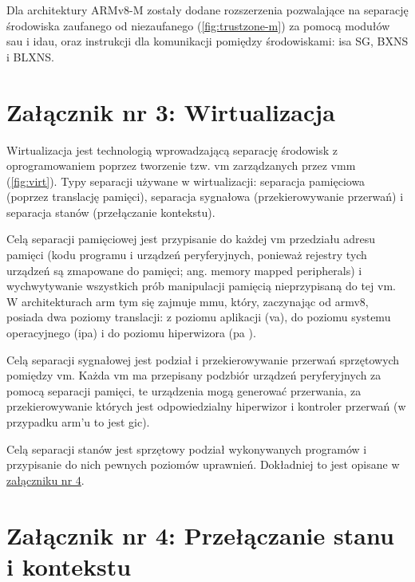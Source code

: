 \documentclass[../main]{subfiles}
\begin{document}
Dla architektury ARMv8-M zostały dodane rozszerzenia pozwalające na separację środowiska zaufanego od
niezaufanego (\cref{fig:trustzone-m}) za pomocą modułów \acrshort{sau} i \acrshort{idau},
oraz instrukcji dla komunikacji pomiędzy środowiskami: \acrshort{isa} SG, BXNS i BLXNS.
\cite{trustzonearmv8m}

\section*{Załącznik nr 3: Wirtualizacja}\label{sec:zalacznik-3}

Wirtualizacja jest technologią wprowadzającą separację środowisk z oprogramowaniem poprzez tworzenie
tzw. \acrshort{vm} zarządzanych przez \acrshort{vmm} (\cref{fig:virt}). Typy separacji używane w
wirtualizacji: separacja pamięciowa (poprzez translację pamięci), separacja sygnałowa (przekierowywanie
przerwań) i separacja stanów (przełączanie kontekstu).

Celą separacji pamięciowej jest przypisanie do każdej \acrshort{vm} przedziału adresu pamięci (kodu
programu i urządzeń peryferyjnych, ponieważ rejestry tych urządzeń są zmapowane do pamięci; ang. memory
mapped peripherals) i wychwytywanie wszystkich prób manipulacji pamięcią nieprzypisaną do tej
\acrshort{vm}. W architekturach \acrshort{arm} tym się zajmuje \acrshort{mmu}, który, zaczynając od
\acrshort{arm}v8, posiada dwa poziomy translacji: z poziomu aplikacji (\acrshort{va}), do poziomu
systemu operacyjnego (\acrshort{ipa}) i do poziomu hiperwizora (\acrshort{pa}
\cite{armv8amemtranslation}).

Celą separacji sygnałowej jest podział i przekierowywanie przerwań sprzętowych pomiędzy \acrshort{vm}.
Każda \acrshort{vm} ma przepisany podzbiór urządzeń peryferyjnych za pomocą separacji pamięci, te
urządzenia mogą generować przerwania, za przekierowywanie których jest odpowiedzialny hiperwizor i
kontroler przerwań (w przypadku \acrshort{arm}'u to jest \acrshort{gic}).

Celą separacji stanów jest sprzętowy podział wykonywanych programów i przypisanie do nich pewnych
poziomów uprawnień. Dokładniej to jest opisane w \hyperref[sec:zalacznik-4]{załączniku nr 4}.

\section*{Załącznik nr 4: Przełączanie stanu i kontekstu}\label{sec:zalacznik-4}
\end{document}
